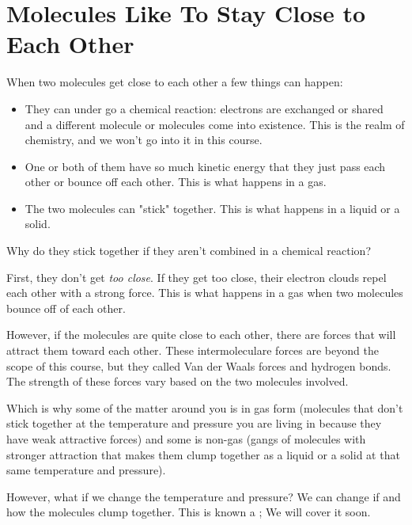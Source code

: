 \section{Molecules Like To Stay Close to Each Other}

When two molecules get close to each other a few things can happen:
\begin{itemize} 
\item They can under go a chemical reaction: electrons are exchanged or shared and a different molecule or molecules come into existence. 
This is the realm of chemistry, and we won't go into it in this course.
\item One or both of them have so much kinetic energy that they just pass each other or bounce off each other. This is what happens in a gas.
\item The two molecules can "stick" together. This is what happens in a liquid or a solid.
\end{itemize}

Why do they stick together if they aren't combined in a chemical reaction?

First, they don't get \emph{too close}. If they get too close, their electron clouds repel each other with a strong force. 
This is what happens in a gas when two molecules bounce off of each other.

However, if the molecules are quite close to each other, there are forces that will attract them toward each other. 
These intermoleculare forces are beyond the scope of this course, but they called Van der Waals forces and hydrogen bonds.  
The strength of these forces vary based on the two molecules involved. 

Which is why some of the matter around you is in gas form (molecules that don't stick together at the temperature and pressure you are living in because they have weak attractive forces) and some is non-gas 
(gangs of molecules with stronger attraction that makes them clump together as a liquid or a solid at that same temperature and pressure).

However, what if we change the temperature and pressure? We can change if and how the molecules clump together. 
This is known a ; We will cover it soon.